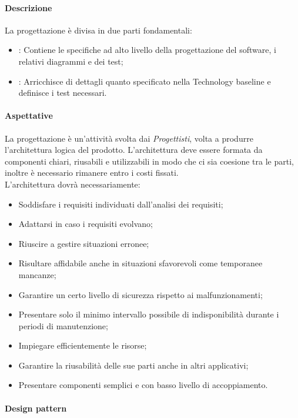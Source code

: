 \paragraph{Descrizione}
La progettazione è divisa in due parti fondamentali:
\begin{itemize}
    \item {}: Contiene le specifiche ad alto livello della progettazione del software, 
    i relativi diagrammi  e dei test;
    \item {}: Arricchisce di dettagli quanto specificato nella Technology baseline e 
    definisce i test necessari.
\end{itemize}

\paragraph{Aspettative}

La progettazione è un'attività svolta dai \emph{Progettisti}, volta a produrre l'architettura logica del prodotto. 
L'architettura deve essere formata da componenti chiari, riusabili e utilizzabili in modo che ci sia coesione tra 
le parti, inoltre è necessario rimanere entro i costi fissati.\\
L'architettura dovrà necessariamente: 
\begin{itemize}
    \item Soddisfare i requisiti individuati dall'analisi dei requisiti;
    \item Adattarsi in caso i requisiti evolvano;
    \item Riuscire a gestire situazioni erronee;
    \item Risultare affidabile anche in situazioni sfavorevoli come temporanee mancanze;
    \item Garantire un certo livello di sicurezza rispetto ai malfunzionamenti;
    \item Presentare solo il minimo intervallo possibile di indisponibilità durante i periodi di manutenzione;
    \item Impiegare efficientemente le risorse;
    \item Garantire la riusabilità delle sue parti anche in altri applicativi;
    \item Presentare componenti semplici e con basso livello di accoppiamento.
\end{itemize}
 
\paragraph{Design pattern}

